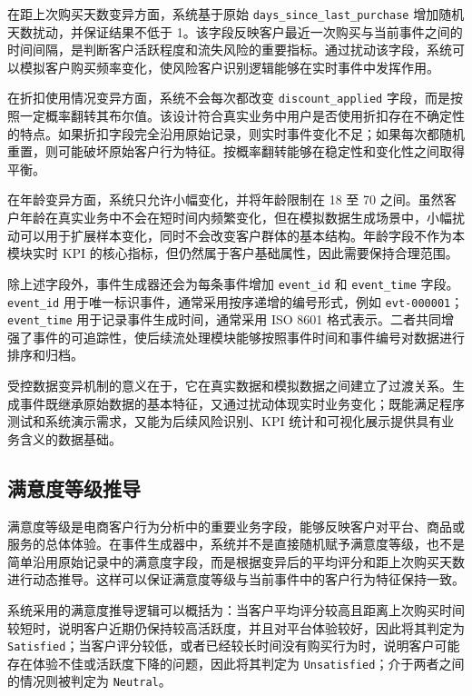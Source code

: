 \documentclass[12pt,hyperref,a4paper,UTF8]{ctexart}
\begin{document}
在距上次购买天数变异方面，系统基于原始 \texttt{days\_since\_last\_purchase} 增加随机天数扰动，并保证结果不低于 1。该字段反映客户最近一次购买与当前事件之间的时间间隔，是判断客户活跃程度和流失风险的重要指标。通过扰动该字段，系统可以模拟客户购买频率变化，使风险客户识别逻辑能够在实时事件中发挥作用。

在折扣使用情况变异方面，系统不会每次都改变 \texttt{discount\_applied} 字段，而是按照一定概率翻转其布尔值。该设计符合真实业务中用户是否使用折扣存在不确定性的特点。如果折扣字段完全沿用原始记录，则实时事件变化不足；如果每次都随机重置，则可能破坏原始客户行为特征。按概率翻转能够在稳定性和变化性之间取得平衡。

在年龄变异方面，系统只允许小幅变化，并将年龄限制在 18 至 70 之间。虽然客户年龄在真实业务中不会在短时间内频繁变化，但在模拟数据生成场景中，小幅扰动可以用于扩展样本变化，同时不会改变客户群体的基本结构。年龄字段不作为本模块实时 KPI 的核心指标，但仍然属于客户基础属性，因此需要保持合理范围。

除上述字段外，事件生成器还会为每条事件增加 \texttt{event\_id} 和 \texttt{event\_time} 字段。\texttt{event\_id} 用于唯一标识事件，通常采用按序递增的编号形式，例如 \texttt{evt-000001}；\texttt{event\_time} 用于记录事件生成时间，通常采用 ISO 8601 格式表示。二者共同增强了事件的可追踪性，使后续流处理模块能够按照事件时间和事件编号对数据进行排序和归档。

受控数据变异机制的意义在于，它在真实数据和模拟数据之间建立了过渡关系。生成事件既继承原始数据的基本特征，又通过扰动体现实时业务变化；既能满足程序测试和系统演示需求，又能为后续风险识别、KPI 统计和可视化展示提供具有业务含义的数据基础。

\subsection{满意度等级推导}

满意度等级是电商客户行为分析中的重要业务字段，能够反映客户对平台、商品或服务的总体体验。在事件生成器中，系统并不是直接随机赋予满意度等级，也不是简单沿用原始记录中的满意度字段，而是根据变异后的平均评分和距上次购买天数进行动态推导。这样可以保证满意度等级与当前事件中的客户行为特征保持一致。

系统采用的满意度推导逻辑可以概括为：当客户平均评分较高且距离上次购买时间较短时，说明客户近期仍保持较高活跃度，并且对平台体验较好，因此将其判定为 \texttt{Satisfied}；当客户评分较低，或者已经较长时间没有购买行为时，说明客户可能存在体验不佳或活跃度下降的问题，因此将其判定为 \texttt{Unsatisfied}；介于两者之间的情况则被判定为 \texttt{Neutral}。
\end{document}
